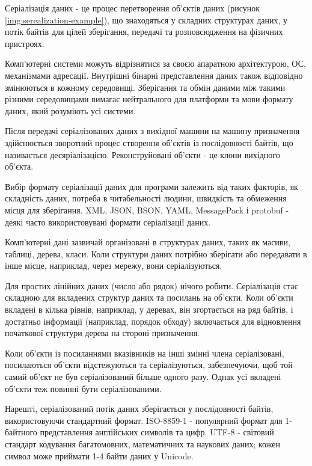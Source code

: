 \documentclass{lib/styles/default-style}
\begin{document}
    Серіалізація даних - це процес перетворення об'єктів даних (рисунок \ref{img:serealization-example}), що знаходяться у складних структурах даних,
    у потік байтів для цілей зберігання, передачі та розповсюдження на фізичних пристроях.

    Комп'ютерні системи можуть відрізнятися за своєю апаратною архітектурою, ОС,
    механізмами адресації. Внутрішні бінарні представлення даних також відповідно
    змінюються в кожному середовищі. Зберігання та обмін даними між такими різними середовищами
    вимагає нейтрального для платформи та мови формату даних, який розуміють усі системи.

    Після передачі серіалізованих даних з вихідної машини на машину призначення
    здійснюється зворотний процес створення об'єктів із послідовності байтів, що називається десяріалізацією.
    Реконструйовані об'єкти - це клони вихідного об'єкта.

    Вибір формату серіалізації даних для програми залежить
    від таких факторів, як складність даних, потреба в читабельності людини, швидкість
    та обмеження місця для зберігання. XML, JSON, BSON, YAML, MessagePack і protobuf - деякі
    часто використовувані формати серіалізації даних.


    Комп'ютерні дані зазвичай організовані в структурах даних, таких як масиви,
    таблиці, дерева, класи. Коли структури даних потрібно зберігати або передавати
    в інше місце, наприклад, через мережу, вони серіалізуються.

    Для простих лінійних даних (число або рядок) нічого робити.
    Серіалізація стає складною для вкладених структур даних та посилань на об'єкти.
    Коли об'єкти вкладені в кілька рівнів, наприклад, у деревах, він згортається на ряд
    байтів, і достатньо інформації (наприклад, порядок обходу) включається для відновлення
    початкової структури дерева на стороні призначення.

    Коли об'єкти із посиланнями вказівників
    на інші змінні члена серіалізовані, посилаються об'єкти відстежуються та
    серіалізуються, забезпечуючи, щоб той самий об’єкт не був серіалізований більше одного разу.
    Однак усі вкладені об'єкти теж повинні бути серіалізованими.

    Нарешті, серіалізований потік даних зберігається у послідовності байтів,
    використовуючи стандартний формат.
    ISO-8859-1 - популярний формат для 1-байтного представлення англійських символів та цифр.
    UTF-8 - світовий стандарт кодування багатомовних, математичних та наукових даних; кожен символ може приймати 1-4 байти даних у Unicode.
\end{document}

